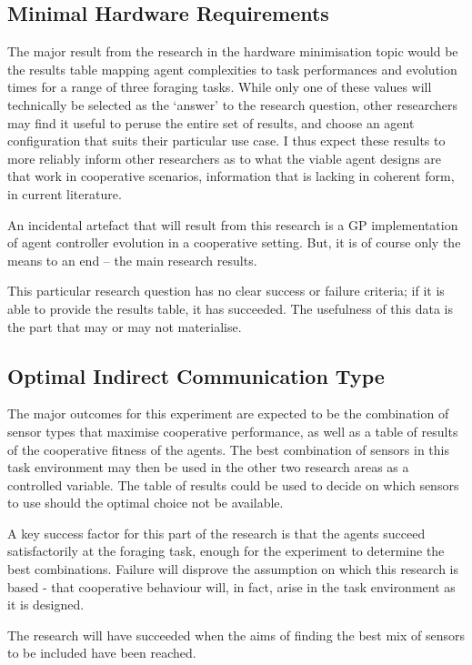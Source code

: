 \documentclass[a4paper,12pt]{article}
\begin{document}
\subsection{Minimal Hardware Requirements}
The major result from the research in the hardware minimisation topic would be the results table mapping agent complexities to task performances and evolution times for a range of three foraging tasks. While only one of these values will technically be selected as the ‘answer’ to the research question, other researchers may find it useful to peruse the entire set of results, and choose an agent configuration that suits their particular use case.
I thus expect these results to more reliably inform other researchers as to what the viable agent designs are that work in cooperative scenarios, information that is lacking in coherent form, in current literature.

An incidental artefact that will result from this research is a GP implementation of agent controller evolution in a cooperative setting. But, it is of course only the means to an end -- the main research results.

This particular research question has no clear success or failure criteria; if it is able to provide the results table, it has succeeded. The usefulness of this data is the part that may or may not materialise.

\subsection{Optimal Indirect Communication Type}
The major outcomes for this experiment are expected to be the combination of sensor types that maximise cooperative performance, as well as a table of results of the cooperative fitness of the agents. The best combination of sensors in this task environment may then be used in the other two research areas as a controlled variable. The table of results could be used to decide on which sensors to use should the optimal choice not be available.

A key success factor for this part of the research is that the agents succeed satisfactorily at the foraging task, enough for the experiment to determine the best combinations. Failure will disprove the assumption on which this research is based - that cooperative behaviour will, in fact, arise in the task environment as it is designed.

The research will have succeeded when the aims of finding the best mix of sensors to be included have been reached.
\end{document}
